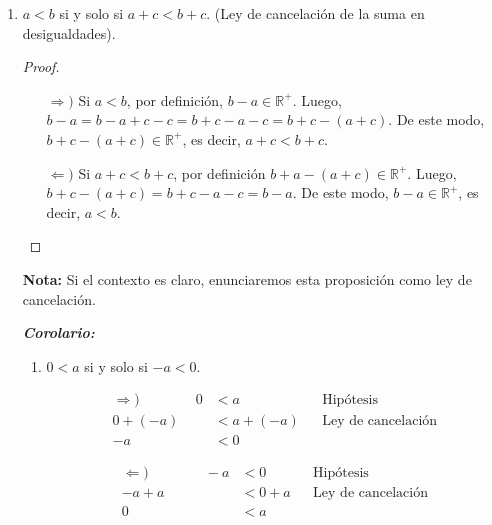 \documentclass[11pt]{article}
\newcommand{\R}{\mathbb{R}}
\newcommand{\bfit}[1]{\textbf{\textit{#1}}}
\begin{document}
\begin{enumerate}[label=\alph*)]
 \item $a<b$ si y solo si $a+c<b+c$. (Ley de cancelación de la suma en desigualdades).
 
 \begin{proof} \leavevmode
 \begin{itemize}
  \item[$\Rightarrow)$] Si $a<b$, por definición, $b-a \in \R^+$. Luego, $b-a=b-a+c-c=b+c-a-c=b+c-(a+c)$. De este modo, $b+c-(a+c)\in \R^+$, es decir, $a+c<b+c$.
  \item[$\Leftarrow)$] Si $a+c<b+c$, por definición $b+a-(a+c)\in \R^+$. Luego, $b+c-(a+c)=b+c-a-c=b-a$. De este modo, $b-a\in \R^+$, es decir, $a<b$. \qedhere
  \end{itemize} 
 \end{proof}
 \textbf{Nota:} Si el contexto es claro, enunciaremos esta proposición como ley de cancelación.

 \bfit{Corolario:}
 \begin{enumerate}[label=\roman*)]
  \item $0<a$ si y solo si $-a<0$.
  \begin{center}\vspace{-1em}
   \begin{minipage}[l]{.5\linewidth}
    \begin{align*}
     \Rightarrow) \qquad \qquad
     0 &< a && \text{Hipótesis}\\
     0 + (-a) &< a + (-a) && \text{Ley de cancelación}\\
     -a &< 0%
    \end{align*}
  \end{minipage}%
  \begin{minipage}[r]{.5\linewidth}
   \begin{align*}
    \Leftarrow) \qquad \qquad
    -a &< 0 && \text{Hipótesis}\\
    -a + a &< 0 + a && \text{Ley de cancelación}\\
    0 &< a%
   \end{align*}
  \end{minipage}
  \end{center}


\end{enumerate}
\end{enumerate}
\end{document}
